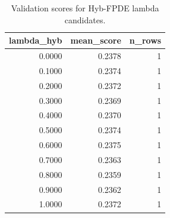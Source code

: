 \begin{table}[t]
\caption{Validation scores for Hyb-FPDE lambda candidates.}
\label{tab:lambda_distribution_computed}
\centering
\begin{tabular}{rrr}
\toprule
lambda\_hyb & mean\_score & n\_rows \\
\midrule
0.0000 & 0.2378 & 1 \\
0.1000 & 0.2374 & 1 \\
0.2000 & 0.2372 & 1 \\
0.3000 & 0.2369 & 1 \\
0.4000 & 0.2370 & 1 \\
0.5000 & 0.2374 & 1 \\
0.6000 & 0.2375 & 1 \\
0.7000 & 0.2363 & 1 \\
0.8000 & 0.2359 & 1 \\
0.9000 & 0.2362 & 1 \\
1.0000 & 0.2372 & 1 \\
\bottomrule
\end{tabular}

\end{table}
